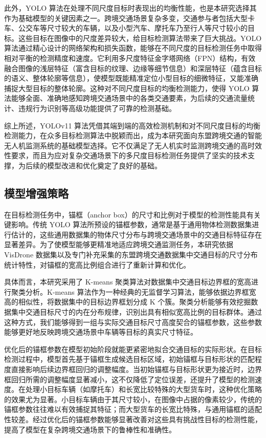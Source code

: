 \documentclass[runningheads]{llncs}
\begin{document}
此外，YOLO 算法在处理不同尺度目标时表现出的均衡性能，也是本研究选择其作为基础模型的关键因素之一。跨境交通场景复杂多变，交通参与者包括大型卡车、公交车等尺寸较大的车辆，以及小型汽车、摩托车乃至行人等尺寸较小的目标。这些目标在图像中的尺度差异较大，给目标检测算法带来了巨大挑战。YOLO 算法通过精心设计的网络架构和损失函数，能够在不同尺度的目标检测任务中取得相对平衡的检测精度和速度。它利用多尺度特征金字塔网络（FPN）\cite{fpn}结构，有效融合图像的浅层特征（富含目标的纹理、边缘等细节信息）和深层特征（蕴含目标的语义、整体轮廓等信息），使模型既能精准定位小型目标的细微特征，又能准确捕捉大型目标的整体轮廓。这种对不同尺度目标的均衡检测能力，使得 YOLO 算法能够全面、准确地感知跨境交通场景中的各类交通要素，为后续的交通流量统计、违规行为识别等高级功能提供了可靠的检测基础。

综上所述，YOLOv11 算法凭借其端到端的高效检测机制和对不同尺度目标的均衡检测能力，在众多目标检测算法中脱颖而出，成为本研究面向东盟跨境交通的智能无人机监测系统的基础模型选择。它不仅满足了无人机实时监测跨境交通的高时效性要求，而且为应对复杂交通场景下的多尺度目标检测任务提供了坚实的技术支撑，为后续的模型改进和优化奠定了良好的基础。

\subsection{模型增强策略}

在目标检测任务中，锚框（anchor box）的尺寸和比例对于模型的检测性能具有关键影响。传统 YOLO 算法所预设的锚框参数，通常是基于通用物体检测数据集进行估计的，这些通用数据集的物体尺寸分布与跨境交通场景中的交通目标特征存在显著差异。为了使模型能够更精准地适应跨境交通监测任务，本研究依据 VisDrone 数据集以及专门补充采集的东盟跨境交通数据集中交通目标的尺寸分布统计特性，对锚框的宽高比例组合进行了重新计算和优化。

具体而言，本研究采用了 K-means 聚类算法对数据集中交通目标边界框的宽高进行聚类分析。K-means 算法作为一种经典的无监督学习算法，能够依据边界框宽高的相似性，将数据集中的目标边界框划分成 K 个簇。聚类分析能够有效挖掘数据集中交通目标尺寸的内在分布规律，识别出具有相似宽高比例的目标群体。通过这种方式，我们能够得到一组与实际交通目标尺寸高度契合的锚框参数，这些参数能够更好地反映跨境交通场景中车辆等目标的真实尺寸特征。

优化后的锚框参数在模型初始阶段就能更紧密地拟合交通目标的实际形状。在目标检测过程中，模型首先基于锚框生成候选目标区域，初始锚框与目标形状的匹配程度直接影响后续边界框回归的调整幅度。当初始锚框与目标形状更为接近时，边界框回归所需的调整幅度显著减小，这不仅降低了定位误差，还提升了模型的检测速度。在处理小目标车辆（如摩托车）和长宽比较特殊的大型货车时，这种优化策略的效果尤为显著。小目标车辆由于其尺寸较小，在图像中占据的像素较少，传统的锚框参数往往难以有效捕捉其特征；而大型货车的长宽比特殊，与通用锚框的适配性较差。经过优化后的锚框参数能够显著改善对这些具有挑战性目标的检测性能，提高了模型在复杂跨境交通场景下的鲁棒性和准确性。
\end{document}
